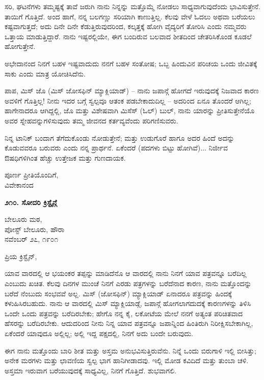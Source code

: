 ಸರಿ, ಘಟನೆಗಳು ತಮ್ಮಷ್ಟಕ್ಕೆ ತಾವೆ ಜರುಗಿ ನಾನು ನಿನ್ನನ್ನು ಮತ್ತೊಮ್ಮೆ ನೋಡಲು ಸಾಧ್ಯವಾಗುವುದೆಂದು ಭಾವಿಸುತ್ತೇನೆ. ತಾಯಿಗೆ ಗೊತ್ತಿದೆ. ಅಂದ ಹಾಗೆ, ನನ್ನ ಬಲಗಣ್ಣು ಸರಿಯಾಗಿ ಕಾಣುತ್ತಿಲ್ಲ. ಕೆಲವು ವೇಳೆ ಓದಲು ಅಥವಾ ಬರೆಯಲು ಕಷ್ಟವಾಗುತ್ತದೆ; ಅದು ದಿನೇ ದಿನೇ ಕೆಡುತ್ತಿರುವುದರಿಂದ, ಕಲ್ಕತ್ತಕ್ಕೆ ಹೋಗಿ ವೈದ್ಯರಿಗೆ ತೋರಿಸಿ ಎಂದು ನಮ್ಮವರು ಒತ್ತಾಯ ಮಾಡುತ್ತಿದ್ದಾರೆ. ನಾನು ಇಷ್ಟರಲ್ಲಿಯೇ, ಈಗ ಬಂದಿರುವ ಬಲವಾದ ಶೀತದಿಂದ ಚೇತರಿಸಿಕೊಂಡ ಕೂಡಲೆ ಹೋಗುತ್ತೇನೆ.

ಅಭೇದಾನಂದ ನಿನಗೆ ಬಹಳ ಇಷ್ಟವಾದುದು ನನಗೆ ಬಹಳ ಸಂತೋಷ; ಒಬ್ಬ ಹಿಂದುವಿನ ಪರಿಚಯ ಒಂದು ಜೀವಿತಕ್ಕೆ ಸಾಕು ಎಂದು ಮಾತ್ರ ಯೋಚಿಸಿದೆನು.

ಪಾಪ, ಮಿಸ್ ಜೊ (ಮಿಸ್ ಜೋಸಫಿನ್ ಮ್ಯಾಕ್ಲಿಯಾಡ್) – ನಾನು ಜಪಾನ್ಗೆ ಹೋಗದೆ ಇರುವುದಕ್ಕೆ ನಿಜವಾದ ಕಾರಣ ಅವಳಿಗೆ ಗೊತ್ತಿಲ್ಲ! ನೀನು ಇದರ ಬಗ್ಗೆ ಸ್ವಲ್ಪವೂ ಆತಂಕ ಪಡಬೇಕಾದುದಿಲ್ಲ – ಅದರಿಂದ ಏನೂ ತೊಂದರೆ ಆಗಿಲ್ಲ; ಹಾಗೇನಾದರೂ ಆಗಿದ್ದಲ್ಲಿ, ಜೊ ಮತ್ತು ವಿಶೇಷವಾಗಿ ಮಿಸೆಸ್ (ಓಲ್) ಬುಲ್, ನಾನು ಯಾರನ್ನು ಪ್ರೀತಿಸುತ್ತೇನೆಯೊ ಅವರ ಸ್ನೇಹವನ್ನುಗಳಿಸುವುದು ತಮ್ಮ ಜೀವನದ ಕರ್ತವ್ಯವೆಂದು ಪರಿಗಣಿಸುವರು.

ನಿನ್ನ ಟಾನಿಕ್ ಬಂದಾಗ ತೆಗೆದುಕೊಂಡು ನೋಡುತ್ತೇನೆ; ಮತ್ತು ಉಡುಗೊರೆ ಹಾಗೂ ಅದರ ಹಿಂದೆ ಅದನ್ನು ಕೊಡುವವರೂ ಬರುವರು ಎಂದು ನನ್ನ ಪ್ರಾರ್ಥನೆ. ಏಕೆಂದರೆ (ಪದಗಳು ಬಿಟ್ಟು ಹೋಗಿವೆ)... ನಿರ್ಜೀವ ಔಷಧಿಗಳಿಗಿಂತ ಹೆಚ್ಚು ಉತ್ತೇಜಕ ಮತ್ತು ಗುಣದಾಯಕ.

\begin{flushright}
ಪೂರ್ಣ ಪ್ರೀತಿಯೊಂದಿಗೆ,\\ವಿವೇಕಾನಂದ
\end{flushright}

\begin{center}
\textbf{೨೧೦. ಸೋದರಿ ಕ್ರಿಸ್ಟೈನ್ಗೆ}
\end{center}

\begin{flushright}
ಬೇಲೂರು ಮಠ,\\ಪೋಸ್ಟ್ ಬೇಲೂರು, ಹೌರಾ\\ನವೆಂಬರ್ ೨೭, ೧೯೦೧
\end{flushright}

ಪ್ರಿಯ ಕ್ರಿಸ್ಟೈನ್,

ಯಾವ ವಾರದಲ್ಲಿ ಆ ಭಯಂಕರ ತಪ್ಪನ್ನು ಮಾಡಿದೆನೊ ಆ ವಾರದಲ್ಲಿ ನಾನು ನಿನಗೆ ಯಾವ ಪತ್ರವನ್ನೂ ಬರೆದಿಲ್ಲ ಎಂಬುದು ಖಚಿತ. ಕೆಲವು ದಿನಗಳ ಮುಂಚೆ ನಿನಗೆ ಎರಡು ಪತ್ರಗಳನ್ನು ಬರೆದೆನಾದ ಕಾರಣ, ನಾನು ಮತ್ತೊಂದನ್ನು ಬರೆದೆ ನೆಂಬುದು ಸಂಭವವೆ ಅಲ್ಲ. ಮಿಸ್ (ಜೋಸಫಿನ್) ಮ್ಯಾಕ್ಲಿಯಾಡ್ ಏನಾದರೂ ಪತ್ರವನ್ನು ಹಿಂದಕ್ಕೆ ಕಳುಹಿಸಿರಬಹುದು. ನಾನು ಆ ವಾರದಲ್ಲಿ ಮಿಸ್ ಮ್ಯಾಕ್ಲಿಯಾಡ್ಗೆ, ಜಪಾನ್ಗೆ ಹೋಗಲಾಗದುದಕ್ಕೆ ಕಾರಣಗಳನ್ನು ತಿಳಿಸಿ ಒಂದೇ ಒಂದು ಪತ್ರವನ್ನು ಬರೆದಿರಬೇಕು; ಹೇಗೊ ನನ್ನ ಕೈ, ಲಕೋಟೆಯ ಮೇಲೆ ನನಗೆ ಅತ್ಯಂತ ಪರಿಚಿತವಾದ ಹೆಸರನ್ನು ಬರೆದಿರಬೇಕು. ಆದುದರಿಂದ ನೀನು ನಿನ್ನ ಯಾವ ಪತ್ರವನ್ನೂ ಜಪಾನ್ನಿಂದ ಹಿಂತಿರುಗಿ ನಿರೀಕ್ಷಿಸಬೇಕಾಗಿಲ್ಲ, ಏಕೆಂದರೆ ಯಾವುದೂ ಅಲ್ಲಿಲ್ಲ; ಅಲ್ಲಿ ಇದ್ದ ಪಕ್ಷದಲ್ಲಿ, ನಿನಗೆ ಅದು ಬಂದೇ ಬರುವುದು.

ಈಗ ನಾನು ಮತ್ತೊಂದು ಬಾರಿ ಶೀತ ಮತ್ತು ಅಸ್ತಮ ಅನುಭವಿಸುತ್ತಿರುವೆನು. ನಿನ್ನೆ ಒಂದು ಬಿರುಗಾಳಿ ಇಲ್ಲಿ ಬೀಸಿತ್ತು; ಅನೇಕ ಮರಗಳು ಮತ್ತು ಛಾವಣಿಯ ಸ್ವಲ್ಪ ಭಾಗ ಹಾನಿಗೀಡಾದವು. ಇಲ್ಲಿ ಮೋಡ ಕವಿದಿದೆ ಮತ್ತು ತುಂಬಾ ಚಳಿ. ಅಸ್ತಮಾ ಇರುವಾಗ ಬರೆಯುವುದಕ್ಕೆ ಸಾಧ್ಯವಿಲ್ಲ, ನಿನಗೆ ಗೊತ್ತಿದೆ. ಶುಭವಾಗಲಿ.

